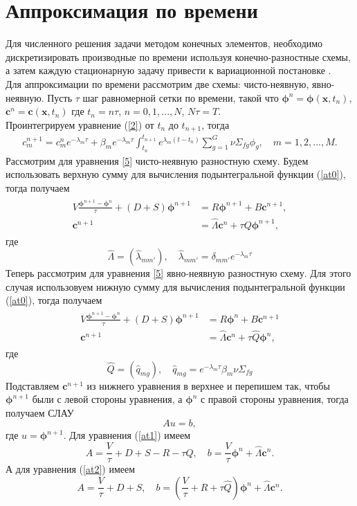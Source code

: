 \section{Аппроксимация по времени}
\label{s-3}
Для численного решения задачи методом конечных элементов, необходимо дискретизировать производные по времени используя конечно-разностные схемы, а затем каждую стационарную задачу привести к вариационной постановке \cite{hebert}.\\
Для аппроксимации по времени рассмотрим две схемы: чисто-неявную, явно-неявную. Пусть $\tau$ шаг  равномерной сетки по времени, такой что $\bm\phi^{n}=\bm\phi(\bm x,t_n)$, $\bm c^n=\bm c(\bm x, t_n)$ где $t_n=n\tau$, $n=0,1,...,N$, $N\tau=T$.  \\
Проинтегрируем уравнение (\ref{2}) от $t_{n}$ до $t_{n+1}$, тогда
\begin{align}\label{at0}
c_m^{n+1} = c_m^n e^{-\lambda_m\tau} + \beta_m e^{-\lambda_m\tau}\int_{t_n}^{t_{n+1}}e^{\lambda_m (t-t_n)} \sum_{g=1}^{G} \nu \Sigma_{fg} \phi_g,
 \quad m = 1,2, ..., M.
\end{align}
Рассмотрим для уравнения \ref{5} чисто-неявную разностную схему. Будем использовать верхную сумму для вычисления подынтегральной функции (\ref{at0}), тогда получаем
\begin{align}\label{at1}
\begin{split}
V \frac{\bm\phi^{n+1}-\bm\phi^n}{\tau}+(D+S) 
\bm \phi^{n+1} &= R \bm \phi^{n+1} + B\bm c^{n+1},
\\
\bm{c}^{n+1} & = \hat{\Lambda}\bm{c}^{n} + \tau Q \bm{\phi}^{n+1},
\end{split}
\end{align}
где
\[
\hat{\Lambda} = (\hat{\lambda}_{mm'}), \quad \hat{\lambda}_{mm'} = \delta_{mm'} e^{-\lambda_m\tau}
\]
Теперь рассмотрим для уравнения \ref{5} явно-неявную разностную схему. Для этого случая использовуем нижную сумму для вычисления подынтегральной функции (\ref{at0}), тогда получаем
\begin{align}\label{at2}
\begin{split}
V \frac{\bm{\phi}^{n+1} - \bm{\phi}^{n}}{\tau}+(D+S)\bm{\phi}^{n+1} &= R\bm{\phi}^{n} + B\bm{c}^{n+1} \\
\bm{c}^{n+1} & = \hat{\Lambda}\bm{c}^{n} + \tau \hat{Q} \bm{\phi}^{n},
\end{split}
\end{align}
где 
\[
\hat{Q} = (\hat{q}_{mg}), \quad \hat{q}_{mg}=e^{-\lambda_m\tau}\beta_m\nu\Sigma_{fg}
\]
Подставляем $\bm{c}^{n+1}$ из нижнего уравнения в верхнее 
 и перепишем так, чтобы $\bm\phi^{n+1}$ были с левой стороны уравнения, а $\bm\phi^{n}$ с правой стороны уравнения, тогда получаем СЛАУ
\[
A u = b,
\]
где $u = \bm\phi^{n+1}$. Для уравнения (\ref{at1}) имеем
\[
A = \frac{V}{\tau}+D+S-R-\tau Q,\quad
b = \frac{V}{\tau}\bm\phi^n + \hat\Lambda \bm c^n.
\]
А для уравнения (\ref{at2}) имеем
\[
A = \frac{V}{\tau}+D+S, \quad
b = \left(\frac{V}{\tau}+R+\tau \hat Q\right)\bm\phi^n + \hat\Lambda \bm c^n.
\]

